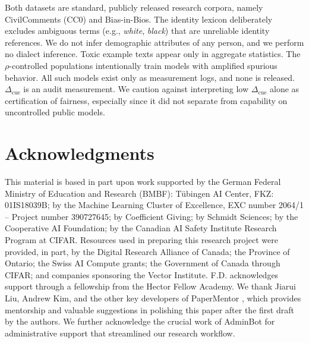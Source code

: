 \documentclass[11pt]{article}
\newcommand{\cued}{\ensuremath{\Delta_{\mathrm{cue}}}}
\begin{document}
Both datasets are standard, publicly released research corpora, namely
CivilComments (CC0) and Bias-in-Bios. The identity lexicon deliberately excludes ambiguous
terms (e.g., \emph{white}, \emph{black}) that are unreliable identity
references. We do not infer demographic attributes of any person, and we
perform no dialect inference. Toxic example texts appear only in aggregate
statistics. The $\rho$-controlled populations intentionally train models with
amplified spurious behavior. All such models exist only as measurement logs,
and none is released. \cued{} is an audit measurement. We caution against interpreting low \cued{} alone as certification of fairness, especially since it did not separate from capability on uncontrolled public models.

\section*{Acknowledgments}
This material is based in part upon work supported
by the German Federal Ministry of Education and Research (BMBF): Tübingen AI Center, FKZ: 01IS18039B; by the Machine Learning Cluster of Excellence, EXC number 2064/1 – Project number 390727645; %
by Coefficient Giving; %
by Schmidt Sciences; %
by the Cooperative AI Foundation; by the Canadian AI Safety Institute Research Program at CIFAR. %
Resources used in preparing this research project were provided, in part, by the Digital Research Alliance of Canada; the Province of Ontario; the Swiss AI Compute grants; the Government of Canada through CIFAR; and companies sponsoring the Vector Institute.
F.D. acknowledges support through a fellowship from the Hector Fellow Academy.
We thank Jiarui Liu, Andrew Kim, and the other key developers of PaperMentor \citep{liu2026papermentorhumancenteredmultiagentwriting}, which provides mentorship and valuable suggestions in polishing this paper after the first draft by the authors. We further acknowledge the crucial work of AdminBot for administrative support that streamlined our research workflow.
\end{document}
